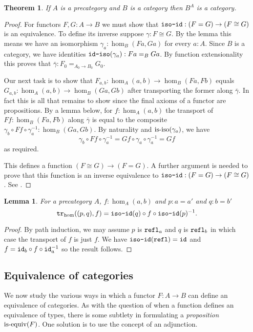 \documentclass{amsart}
\theoremstyle{theorem}
\newtheorem*{thm}{Theorem}
\newtheorem*{lem}{Lemma}
\theoremstyle{definition}
\theoremstyle{remark}
\newcommand{\0}{\mathbbe{0}}
\newcommand{\1}{\mathbbe{1}}
\newcommand{\2}{\mathbbe{2}}
\newcommand{\3}{\mathbbe{3}}
\newcommand{\4}{\mathbbe{4}}
\newcommand{\term}[1]{{\textup{\texttt{#1}}}}
\newcommand{\type}[1]{{\textup{#1}}}
\newcommand{\id}{\term{id}}
\newcommand{\refl}{\term{refl}}
\newcommand{\tr}{\term{tr}}
\newcommand{\is}[1]{\type{is-{#1}}}
\begin{document}
\begin{thm} If $A$ is a precategory and $B$ is a category then $B^A$ is a category.
\end{thm}
\begin{proof}
For functors $F, G : A \to B$ we must show that $\term{iso-id} : (F =G) \to (F \cong G)$ is an equivalence. To define its inverse suppose $\gamma : F \cong G$. By the lemma this means we have an isomorphism $\gamma_a : \hom_B(Fa,Ga)$ for every $a :A$. Since $B$ is a category, we have identities $\term{id-iso}(\gamma_a) : Fa =_B Ga$. By function extensionality this proves that $\bar{\gamma} : F_0 =_{A_0 \to B_0} G_0$. 

Our next task is to show that $F_{a,b} : \hom_A(a,b) \to \hom_B(Fa,Fb)$ equals $G_{a,b} : \hom_A(a,b) \to \hom_B(Ga,Gb)$ after transporting the former along $\bar{\gamma}$. In fact this is all that remains to show since the final axioms of a functor are propositions. By a lemma below, for $f : \hom_A(a,b)$ the transport of $Ff : \hom_B(Fa,Fb)$ along $\bar{\gamma}$ is equal to the composite $\gamma_b \circ Ff \circ \gamma_a^{-1} : \hom_B(Ga,Gb)$. By naturality and $\is{iso}(\gamma_a)$, we have
\[ \gamma_b \circ Ff \circ \gamma_a^{-1} = Gf \circ \gamma_a \circ \gamma_a^{-1} = Gf\] as required.

This defines a function $(F \cong G) \to (F=G)$. A further argument is needed to prove that this function is an inverse equivalence to $\term{iso-id} : (F=G) \to (F \cong G)$. See \cite[9.2.5]{book-hott}.
\end{proof}

\begin{lem} For a precategory $A$, $f : \hom_A(a,b)$ and $p : a = a'$ and $q : b = b'$
\[ \tr_{\hom}((p,q),f) = \term{iso-id}(q) \circ f \circ \term{iso-id}(p)^{-1}.\]
\end{lem}
\begin{proof} By path induction, we may assume $p$ is $\refl_a$ and $q$ is $\refl_b$ in which case the transport of $f$ is just $f$. We have $\term{iso-id}(\refl) = \id$ and $f = \id_b \circ f \circ \id_a^{-1}$ so the result follows.
\end{proof}

\subsection*{Equivalence of categories}
 
We now study the various ways in which a functor $F \colon A \to B$ can define an equivalence of categories. As with the question of when a function defines an equivalence of types, there is some subtlety in formulating a \emph{proposition} $\is{equiv}(F)$. One solution is to use the concept of an adjunction.
\end{document}
